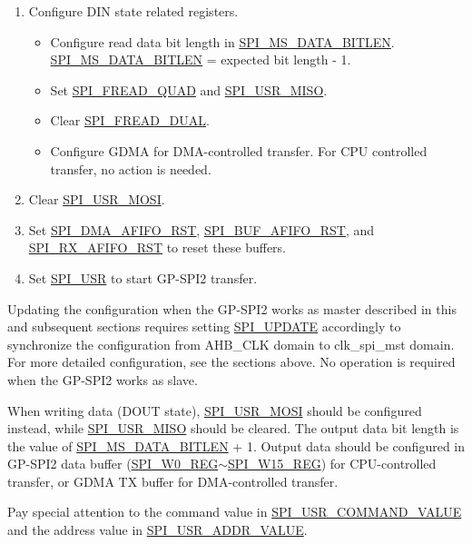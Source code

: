 \documentclass[main\_\_EN.tex]{subfiles}
\begin{document}
\begin{enumerate}
    \item Configure DIN state related registers.
        \begin{itemize}
            \item Configure read data bit length in \hyperref[fielddesc:SPIMSDATABITLEN]{SPI\_MS\_DATA\_BITLEN}. \hyperref[fielddesc:SPIMSDATABITLEN]{SPI\_MS\_DATA\_BITLEN} = expected bit length - 1.
            \item Set \hyperref[fielddesc:SPIFREADQUAD]{SPI\_FREAD\_QUAD} and \hyperref[fielddesc:SPIUSRMISO]{SPI\_USR\_MISO}.
            \item Clear \hyperref[fielddesc:SPIFREADDUAL]{SPI\_FREAD\_DUAL}.
            \item Configure GDMA for DMA-controlled transfer. For CPU controlled transfer, no action is needed.
        \end{itemize}
    \item Clear \hyperref[fielddesc:SPIUSRMOSI]{SPI\_USR\_MOSI}.
    \item Set \hyperref[fielddesc:SPIDMAAFIFORST]{SPI\_DMA\_AFIFO\_RST}, \hyperref[fielddesc:SPIBUFAFIFORST]{SPI\_BUF\_AFIFO\_RST}, and \hyperref[fielddesc:SPIRXAFIFORST]{SPI\_RX\_AFIFO\_RST} to reset these buffers.
    \item Set \hyperref[fielddesc:SPIUSR]{SPI\_USR} to start GP-SPI2 transfer.
\end{enumerate}

\begin{tiplisting}
Updating the configuration when the GP-SPI2 works as master described in this and subsequent sections requires setting \hyperref[fielddesc:SPIUPDATE]{SPI\_UPDATE} accordingly to
synchronize the configuration from AHB\_CLK domain to clk\_spi\_mst domain. For more detailed configuration, see the sections above. No operation is required when the GP-SPI2 works as slave.
\end{tiplisting}

When writing data (DOUT state), \hyperref[fielddesc:SPIUSRMOSI]{SPI\_USR\_MOSI} should be configured instead, while \hyperref[fielddesc:SPIUSRMISO]{SPI\_USR\_MISO} should be cleared. The output data bit length is the value of \hyperref[fielddesc:SPIMSDATABITLEN]{SPI\_MS\_DATA\_BITLEN} + 1. Output data should be configured in GP-SPI2 data buffer (\hyperref[regdesc:SPIW0REG]{SPI\_W0\_REG}$\sim$\hyperref[regdesc:SPIW15REG]{SPI\_W15\_REG}) for CPU-controlled transfer, or GDMA TX buffer for DMA-controlled transfer.

Pay special attention to the command value in \hyperref[fielddesc:SPIUSRCOMMANDVALUE]{SPI\_USR\_COMMAND\_VALUE} and the address value in \hyperref[fielddesc:SPIUSRADDRVALUE]{SPI\_USR\_ADDR\_VALUE}.
\end{document}

